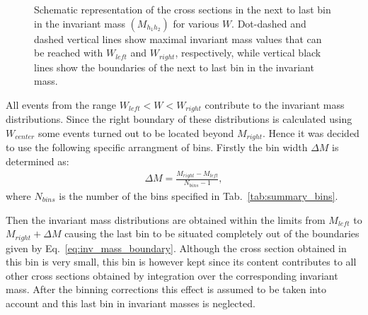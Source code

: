 \documentclass[prc,twocolumn,superscriptaddress,showpacs,amssymb,amsmath,amsfonts,linenumbers,aps]{revtex4-1}
\begin{document}
\begin{figure}[htp]
\begin{center}
\caption{\small Schematic representation of the cross sections in the next to last bin in the invariant mass $(M_{h_{1}h_{2}})$ for various $W$. Dot-dashed and dashed vertical lines show  maximal invariant mass values that can be reached with $W_{left}$ and $W_{right}$, respectively, while vertical black  lines show the boundaries of the next to last bin in the invariant mass.  \label{fig:mass_corr}}
\end{center}
\end{figure}

All events from the range $W_{left} < W < W_{right}$ contribute to the invariant mass distributions. Since
the right boundary of these distributions  is calculated using $W_{center}$ some events turned out to be located beyond $M_{right}$. 
Hence it was decided to use the following specific arrangment of bins.
 Firstly the bin width $\Delta M$ is determined as:
\begin{equation}
\begin{aligned}
\Delta M = \frac{M_{right}-M_{left}}{N_{bins}-1}, \label{eq:bin_width}
\end{aligned}  
\end{equation} 
where $N_{bins}$ is the number of the bins specified in Tab.~\ref{tab:summary_bins}. 

Then the invariant mass distributions are obtained within the limits from $M_{left}$ to $M_{right}+\Delta M$ causing the last bin to be situated completely out of the boundaries given by Eq.~\ref{eq:inv_mass_boundary}. Although the cross section obtained in this bin is very small, this bin is however kept since its content contributes to all other cross sections obtained by integration over the corresponding invariant mass. 
After the binning corrections this effect is assumed to be taken into account and this last bin in invariant masses is neglected. 
\end{document}
